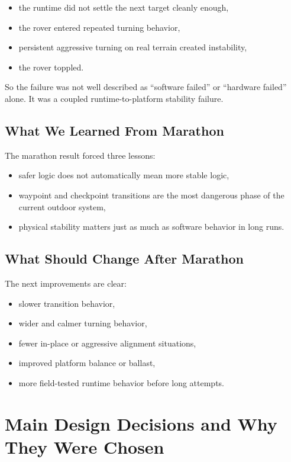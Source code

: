 \documentclass[11pt]{article}
\begin{document}
\begin{itemize}[nosep]
  \item the runtime did not settle the next target cleanly enough,
  \item the rover entered repeated turning behavior,
  \item persistent aggressive turning on real terrain created instability,
  \item the rover toppled.
\end{itemize}

So the failure was not well described as ``software failed'' or ``hardware failed''
alone. It was a coupled runtime-to-platform stability failure.

\subsection{What We Learned From Marathon}

The marathon result forced three lessons:

\begin{itemize}[nosep]
  \item safer logic does not automatically mean more stable logic,
  \item waypoint and checkpoint transitions are the most dangerous phase of the
  current outdoor system,
  \item physical stability matters just as much as software behavior in long runs.
\end{itemize}

\subsection{What Should Change After Marathon}

The next improvements are clear:

\begin{itemize}[nosep]
  \item slower transition behavior,
  \item wider and calmer turning behavior,
  \item fewer in-place or aggressive alignment situations,
  \item improved platform balance or ballast,
  \item more field-tested runtime behavior before long attempts.
\end{itemize}

\section{Main Design Decisions and Why They Were Chosen}
\end{document}
